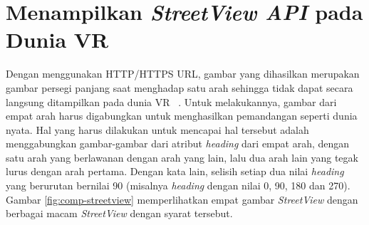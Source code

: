 \section{Menampilkan \textit{StreetView API} pada Dunia VR}
Dengan menggunakan HTTP/HTTPS URL, gambar yang dihasilkan merupakan gambar persegi panjang saat menghadap satu arah sehingga tidak dapat secara langsung ditampilkan pada dunia VR ~\cite{streetview-api}. Untuk melakukannya, gambar dari empat arah harus digabungkan untuk menghasilkan pemandangan seperti  dunia nyata. Hal yang harus dilakukan untuk mencapai hal tersebut adalah menggabungkan gambar-gambar dari atribut \textit{heading} dari empat arah, dengan satu arah yang berlawanan dengan arah yang lain, lalu dua arah lain yang tegak lurus dengan arah pertama. Dengan kata lain, selisih setiap dua nilai \textit{heading} yang berurutan  bernilai 90 (misalnya \textit{heading} dengan nilai 0, 90, 180 dan 270). Gambar \ref{fig:comp-streetview} memperlihatkan empat gambar \textit{StreetView} dengan berbagai macam \textit{StreetView} dengan syarat tersebut.

